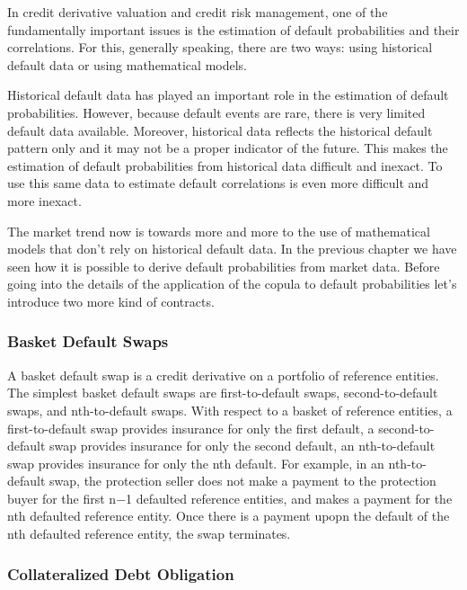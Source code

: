 In credit derivative valuation and credit risk management, one of the
fundamentally important issues is the estimation of default
probabilities and their correlations. For this, generally speaking,
there are two ways: using historical default data or using mathematical
models.

Historical default data has played an important role in the estimation
of default probabilities. However, because default events are rare,
there is very limited default data available. Moreover, historical data
reflects the historical default pattern only and it may not be a proper
indicator of the future. This makes the estimation of default
probabilities from historical data difficult and inexact. To use this
same data to estimate default correlations is even more difficult and
more inexact.

The market trend now is towards more and more to the use of mathematical
models that don't rely on historical default data. In the previous
chapter we have seen how it is possible to derive default probabilities
from market data. Before going into the details of the application of
the copula to default probabilities let's introduce two more kind of
contracts.

\hypertarget{basket-default-swaps}{%
\subsubsection{Basket Default Swaps}\label{basket-default-swaps}}

A basket default swap is a credit derivative on a portfolio of reference
entities. The simplest basket default swaps are first-to-default swaps,
second-to-default swaps, and nth-to-default swaps. With respect to a
basket of reference entities, a first-to-default swap provides insurance
for only the first default, a second-to-default swap provides insurance
for only the second default, an nth-to-default swap provides insurance
for only the nth default. For example, in an nth-to-default swap, the
protection seller does not make a payment to the protection buyer for
the first n−1 defaulted reference entities, and makes a payment for the
nth defaulted reference entity. Once there is a payment upopn the
default of the nth defaulted reference entity, the swap terminates.

\hypertarget{collateralized-debt-obligation}{%
\subsubsection{Collateralized Debt
Obligation}\label{collateralized-debt-obligation}}

